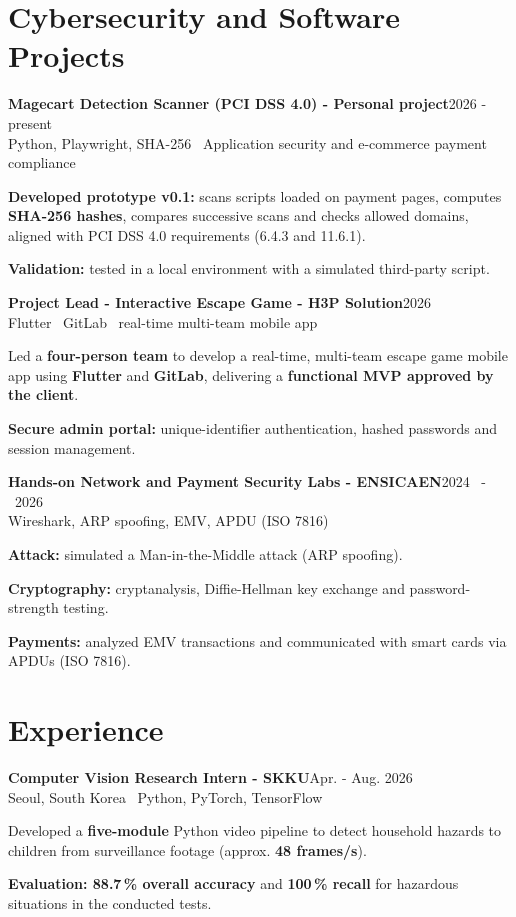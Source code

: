 \documentclass[10pt,a4paper]{article}
\newcommand{\role}[3]{\textbf{\color{ink}#1}\hfill {\color{muted}\footnotesize #2}\\[-1pt]{\color{muted}\footnotesize #3}\par\vspace{3pt}}
\newcommand{\sm}[1]{{\fontsize{8.5}{10.2}\selectfont #1}}
\begin{document}
\section{Cybersecurity and Software Projects}
\role{Magecart Detection Scanner (PCI DSS 4.0) \textnormal{- Personal project}}{2026  -  present}{Python, Playwright, SHA-256 \textbar\ Application security and e-commerce payment compliance}
\begin{itemize}\sm{
\item \textbf{Developed prototype v0.1:} scans scripts loaded on payment pages, computes \textbf{SHA-256 hashes}, compares successive scans and checks allowed domains, aligned with PCI DSS 4.0 requirements (6.4.3 and 11.6.1).
\item \textbf{Validation:} tested in a local environment with a simulated third-party script.
}\end{itemize}
\vspace{0pt}
\role{Project Lead - Interactive Escape Game \textnormal{- H3P Solution}}{2026}{Flutter \textbar\ GitLab \textbar\ real-time multi-team mobile app}
\begin{itemize}\sm{
\item Led a \textbf{four-person team} to develop a real-time, multi-team escape game mobile app using \textbf{Flutter} and \textbf{GitLab}, delivering a \textbf{functional MVP approved by the client}.
\item \textbf{Secure admin portal:} unique-identifier authentication, hashed passwords and session management.
}\end{itemize}
\vspace{4pt}
\role{Hands-on Network and Payment Security Labs \textnormal{- ENSICAEN}}{2024 \ - \ 2026}{Wireshark, ARP spoofing, EMV, APDU (ISO 7816)}
\begin{itemize}\sm{
\item \textbf{Attack:} simulated a Man-in-the-Middle attack (ARP spoofing).
\item \textbf{Cryptography:} cryptanalysis, Diffie-Hellman key exchange and password-strength testing.
\item \textbf{Payments:} analyzed EMV transactions and communicated with smart cards via APDUs (ISO 7816).
}\end{itemize}

\section{Experience}
\role{Computer Vision Research Intern \textnormal{- SKKU}}{Apr. - Aug. 2026}{Seoul, South Korea \textbar\ Python, PyTorch, TensorFlow}
\begin{itemize}\sm{
\item Developed a \textbf{five-module} Python video pipeline to detect household hazards to children from surveillance footage (approx. \textbf{48 frames/s}).
\item \textbf{Evaluation: 88.7\,\% overall accuracy} and \textbf{100\,\% recall} for hazardous situations in the conducted tests.
}\end{itemize}
\end{document}
